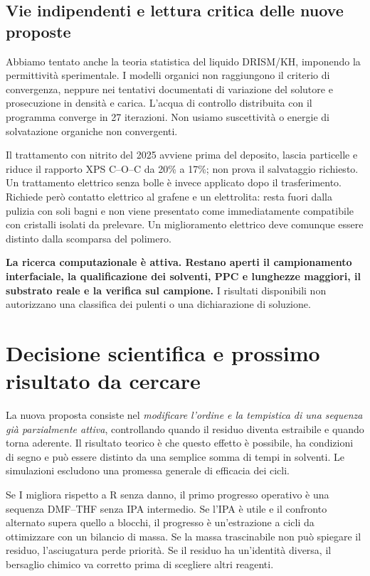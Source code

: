 \documentclass[11pt,reqno]{amsart}
\numberwithin{equation}{section}
\begin{document}
\subsection{Vie indipendenti e lettura critica delle nuove proposte}

Abbiamo tentato anche la teoria statistica del liquido DRISM/KH,
imponendo la permittivit\`a sperimentale. I modelli organici
non raggiungono il criterio di convergenza, neppure nei tentativi
documentati di variazione del solutore e prosecuzione in densit\`a
e carica. L'acqua di controllo distribuita con il programma
converge in 27 iterazioni. Non usiamo suscettivit\`a o energie
di solvatazione organiche non convergenti.

Il trattamento con nitrito del 2025 \cite{LeeNitrite2025} avviene
prima del deposito, lascia particelle e riduce il rapporto XPS
C--O--C da 20\% a 17\%; non prova il salvataggio richiesto.
Un trattamento elettrico senza bolle \cite{Park2018} \`e invece
applicato dopo il trasferimento. Richiede per\`o contatto elettrico
al grafene e un elettrolita: resta fuori dalla pulizia con soli bagni
e non viene presentato come immediatamente compatibile con
cristalli isolati da prelevare. Un miglioramento elettrico deve
comunque essere distinto dalla scomparsa del polimero.

\textbf{La ricerca computazionale \`e attiva. Restano aperti il
campionamento interfaciale, la qualificazione dei solventi,
PPC e lunghezze maggiori, il substrato reale e la verifica sul campione.}
I risultati disponibili non autorizzano una classifica dei pulenti
o una dichiarazione di soluzione.

\section{Decisione scientifica e prossimo risultato da cercare}

La nuova proposta consiste nel \emph{modificare l'ordine e la
tempistica di una sequenza gi\`a parzialmente attiva}, controllando
quando il residuo diventa estraibile e quando torna aderente.
Il risultato teorico \`e che questo effetto \`e possibile, ha
condizioni di segno e pu\`o essere distinto da una semplice
somma di tempi in solventi. Le simulazioni escludono una
promessa generale di efficacia dei cicli.

Se I migliora rispetto a R senza danno, il primo progresso
operativo \`e una sequenza DMF--THF senza IPA intermedio.
Se l'IPA \`e utile e il confronto alternato supera quello
a blocchi, il progresso \`e un'estrazione a cicli da ottimizzare
con un bilancio di massa. Se la massa trascinabile non pu\`o
spiegare il residuo, l'asciugatura perde priorit\`a. Se il
residuo ha un'identit\`a diversa, il bersaglio chimico va
corretto prima di scegliere altri reagenti.
\end{document}
